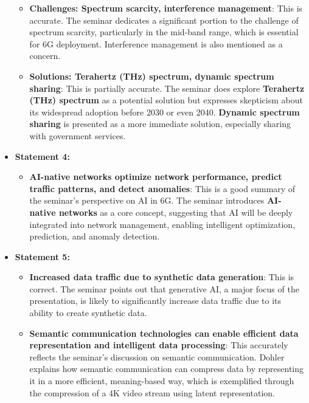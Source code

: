 \documentclass[
]{article}
\begin{document}
\begin{itemize}
  \begin{itemize}
  
  \item
    \textbf{Challenges: Spectrum scarcity, interference management}:
    This is accurate. The seminar dedicates a significant portion to the
    challenge of spectrum scarcity, particularly in the mid-band range,
    which is essential for 6G deployment. Interference management is
    also mentioned as a concern.
  \item
    \textbf{Solutions: Terahertz (THz) spectrum, dynamic spectrum
    sharing}: This is partially accurate. The seminar does explore
    \textbf{Terahertz (THz) spectrum} as a potential solution but
    expresses skepticism about its widespread adoption before 2030 or
    even 2040. \textbf{Dynamic spectrum sharing} is presented as a more
    immediate solution, especially sharing with government services.
  \end{itemize}
\item
  \textbf{Statement 4:}

  \begin{itemize}
  
  \item
    \textbf{AI-native networks optimize network performance, predict
    traffic patterns, and detect anomalies}: This is a good summary of
    the seminar's perspective on AI in 6G. The seminar introduces
    \textbf{AI-native networks} as a core concept, suggesting that AI
    will be deeply integrated into network management, enabling
    intelligent optimization, prediction, and anomaly detection.
  \end{itemize}
\item
  \textbf{Statement 5:}

  \begin{itemize}
  
  \item
    \textbf{Increased data traffic due to synthetic data generation}:
    This is correct. The seminar points out that generative AI, a major
    focus of the presentation, is likely to significantly increase data
    traffic due to its ability to create synthetic data.
  \item
    \textbf{Semantic communication technologies can enable efficient
    data representation and intelligent data processing}: This
    accurately reflects the seminar's discussion on semantic
    communication. Dohler explains how semantic communication can
    compress data by representing it in a more efficient, meaning-based
    way, which is exemplified through the compression of a 4K video
    stream using latent representation.
  \end{itemize}
\end{itemize}
\end{document}
